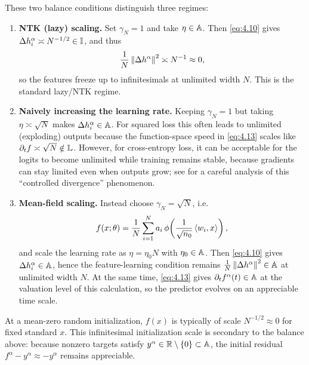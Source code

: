 These two balance conditions distinguish three regimes:
\begin{enumerate}
\item \textbf{NTK (lazy) scaling.} Set $\gamma_N = 1$ and take $\eta \in \mathbb{A}$. Then \eqref{eq:4.10} gives $\Delta h_i^\alpha \asymp N^{-1/2} \in \mathbb{I}$, and thus
\begin{equation}\label{eq:4.14}
\frac{1}{N}\left\lVert \Delta h^\alpha \right\rVert^2 \asymp N^{-1} \approx 0,
\end{equation}
so the features freeze up to infinitesimals at unlimited width $N$. This is the standard lazy/NTK regime.

\item \textbf{Naively increasing the learning rate.} Keeping $\gamma_N = 1$ but taking $\eta \asymp \sqrt{N}$ makes $\Delta h_i^\alpha \in \mathbb{A}$. For squared loss this often leads to unlimited (exploding) outputs because the function-space speed in \eqref{eq:4.13} scales like $\partial_t f \asymp \sqrt{N} \notin \mathbb{L}$. However, for cross-entropy loss, it can be acceptable for the logits to become unlimited while training remains stable, because gradients can stay limited even when outputs grow; see \cite{haas2025surprising} for a careful analysis of this ``controlled divergence'' phenomenon.

\item \textbf{Mean-field scaling.} Instead choose $\gamma_N = \sqrt{N}$, i.e.
\begin{equation}\label{eq:4.15}
f(x; \theta) = \frac{1}{N}\sum_{i=1}^N a_i\,\phi\!\left(\frac{1}{\sqrt{n_0}}\left\langle w_i, x \right\rangle\right),
\end{equation}
and scale the learning rate as $\eta = \eta_0 N$ with $\eta_0 \in \mathbb{A}$. Then \eqref{eq:4.10} gives $\Delta h_i^\alpha \in \mathbb{A}$, hence the feature-learning condition remains $\frac{1}{N}\left\lVert \Delta h^\alpha \right\rVert^2 \in \mathbb{A}$ at unlimited width $N$. At the same time, \eqref{eq:4.13} gives $\partial_t f^\alpha(t) \in \mathbb{A}$ at the valuation level of this calculation, so the predictor evolves on an appreciable time scale.
\end{enumerate}

At a mean-zero random initialization, $f(x)$ is typically of scale $N^{-1/2} \approx 0$ for fixed standard $x$. This infinitesimal initialization scale is secondary to the balance above: because nonzero targets satisfy $y^\alpha \in \mathbb{R} \setminus \{0\} \subset \mathbb{A}$, the initial residual $f^\alpha - y^\alpha \approx -y^\alpha$ remains appreciable.

